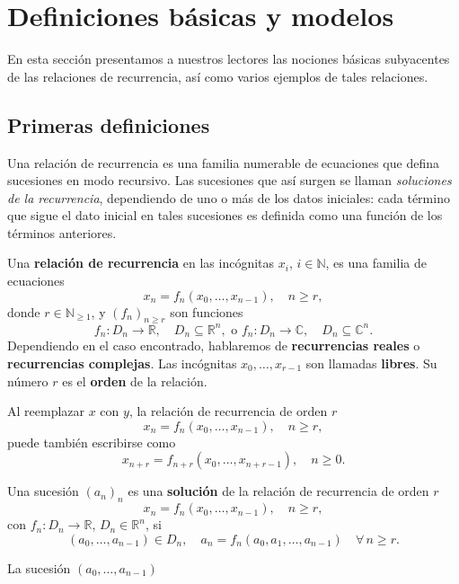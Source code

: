 \documentclass{amsart}
\begin{document}
\section{Definiciones básicas y modelos}
En esta sección presentamos a nuestros lectores las nociones básicas subyacentes de las relaciones de recurrencia, así como varios ejemplos de tales relaciones.
\subsection{Primeras definiciones}
Una relación de recurrencia es una familia numerable de ecuaciones que defina sucesiones en modo recursivo. Las sucesiones que así surgen se llaman \emph{soluciones de la recurrencia}, dependiendo de uno o más de los datos iniciales: cada término que sigue el dato inicial en tales sucesiones es definida como una función de los términos anteriores.

\begin{definition}
	Una \textbf{relación de recurrencia} en las incógnitas $x_{i}$, $i\in\mathbb{N}$, es una familia de ecuaciones \[ x_{n}=f_{n}\left(x_{0},\ldots,x_{n-1}\right),\quad n\geq r, \] donde $r\in\mathbb{N}_{\geq1}$, y ${\left(f_{n}\right)}_{n\geq r}$ son funciones \[ f_{n}\colon D_{n}\rightarrow\mathbb{R},\quad D_{n}\subseteq\mathbb{R}^{n},\text{ o }f_{n}\colon D_{n}\rightarrow\mathbb{C},\quad D_{n}\subseteq\mathbb{C}^{n}. \] Dependiendo en el caso encontrado, hablaremos de \textbf{recurrencias reales} o \textbf{recurrencias complejas}. Las incógnitas $x_{0},\ldots,x_{r-1}$ son llamadas \textbf{libres}. Su número $r$ es el \textbf{orden} de la relación.
	
	Al reemplazar $x$ con $y$, la relación de recurrencia de orden $r$ \[ x_{n}=f_{n}\left(x_{0},\ldots,x_{n-1}\right),\quad n\geq r, \] puede también escribirse como \[ x_{n+r}=f_{n+r}\left(x_{0},\ldots,x_{n+r-1}\right),\quad n\geq0. \]
\end{definition}

\begin{definition}
	Una sucesión ${\left(a_{n}\right)}_{n}$ es una \textbf{solución} de la relación de recurrencia de orden $r$
	\begin{equation}
	x_{n}=f_{n}\left(x_{0},\ldots,x_{n-1}\right),\quad n\geq r,
	\end{equation}
	con $f_{n}\colon D_{n}\rightarrow\mathbb{R}$, $D_{n}\in\mathbb{R}^{n}$, si \[ \left(a_{0},\ldots,a_{n-1}\right)\in D_{n},\quad a_{n}=f_{n}\left(a_{0},a_{1},\ldots,a_{n-1}\right)\quad\forall\,n\geq r. \]
\end{definition}

La sucesión $\left(a_{0},\ldots,a_{n-1}\right)$
\end{document}
